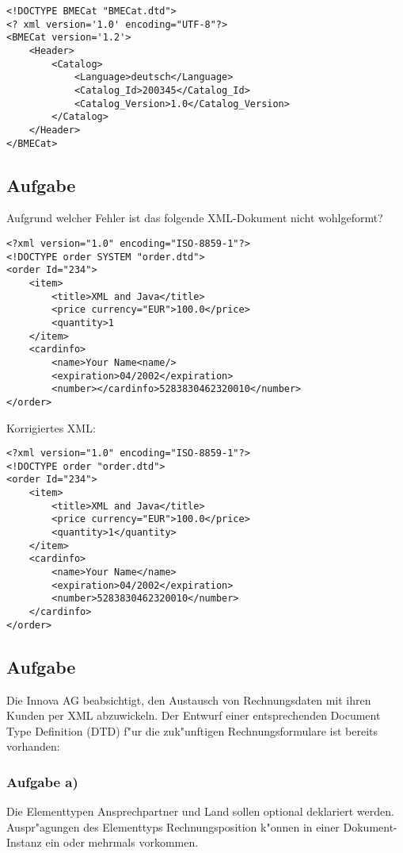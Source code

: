 \lstset{style=customXML}
\begin{lstlisting}
<!DOCTYPE BMECat "BMECat.dtd">
<? xml version='1.0' encoding="UTF-8"?>
<BMECat version='1.2'>
    <Header>
        <Catalog>
            <Language>deutsch</Language>
            <Catalog_Id>200345</Catalog_Id>
            <Catalog_Version>1.0</Catalog_Version>
        </Catalog>
    </Header>
</BMECat>
\end{lstlisting}




\subsection{Aufgabe}
Aufgrund welcher Fehler ist das folgende XML-Dokument nicht wohlgeformt?

\lstset{style=customXML}
\begin{lstlisting}
<?xml version="1.0" encoding="ISO-8859-1"?>
<!DOCTYPE order SYSTEM "order.dtd">
<order Id="234">
    <item>
        <title>XML and Java</title>
        <price currency="EUR">100.0</price>
        <quantity>1
    </item>
    <cardinfo>
        <name>Your Name<name/>
        <expiration>04/2002</expiration>
        <number></cardinfo>5283830462320010</number>
</order>
\end{lstlisting}

Korrigiertes XML:
\lstset{style=customXML}
\begin{lstlisting}
<?xml version="1.0" encoding="ISO-8859-1"?>
<!DOCTYPE order "order.dtd">
<order Id="234">
    <item>
        <title>XML and Java</title>
        <price currency="EUR">100.0</price>
        <quantity>1</quantity>
    </item>
    <cardinfo>
        <name>Your Name</name>
        <expiration>04/2002</expiration>
        <number>5283830462320010</number>
    </cardinfo>
</order>
\end{lstlisting}


\subsection{Aufgabe}

Die Innova AG beabsichtigt, den Austausch von Rechnungsdaten mit ihren Kunden per XML abzuwickeln.
Der Entwurf einer entsprechenden Document Type Definition (DTD) f"ur die zuk"unftigen Rechnungsformulare ist bereits vorhanden:

\subsubsection{Aufgabe a)}
Die Elementtypen Ansprechpartner und Land sollen optional deklariert werden.
Auspr"agungen des Elementtyps Rechnungsposition k"onnen in einer Dokument-Instanz ein oder mehrmals vorkommen.\\

